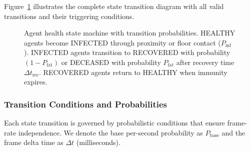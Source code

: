 Figure~\ref{fig:state-machine} illustrates the complete state transition diagram with all valid transitions and their triggering conditions.

\begin{figure}[t]
\centering
{}
\caption{Agent health state machine with transition probabilities. HEALTHY agents become INFECTED through proximity or floor contact ($P_{\text{inf}}$). INFECTED agents transition to RECOVERED with probability $(1 - P_{\text{fat}})$ or DECEASED with probability $P_{\text{fat}}$ after recovery time $\Delta t_{\text{rec}}$. RECOVERED agents return to HEALTHY when immunity expires.}
\label{fig:state-machine}
\end{figure}

\subsubsection{Transition Conditions and Probabilities}

Each state transition is governed by probabilistic conditions that ensure frame-rate independence. We denote the base per-second probability as $P_{\text{base}}$ and the frame delta time as $\Delta t$ (milliseconds).

